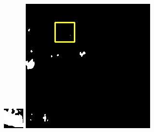 \documentclass[10pt]{ctexart}
\begin{document}
\begin{multicols}{2}
\begin{figure}[H]
{\begin{minipage}[b]{0.15\linewidth}
            \includegraphics[width=1\linewidth]{../log/spoon2/cut2/tmp_cut_LC81620432014072LGN00_16237_unet.jpg}\vspace{4pt}
            \includegraphics[width=1\linewidth]{../log/spoon2/cut2/LC81620432014072LGN00_16329_unet.jpg}\vspace{4pt}

\end{minipage}}
\end{figure}
\end{multicols}
\end{document}
